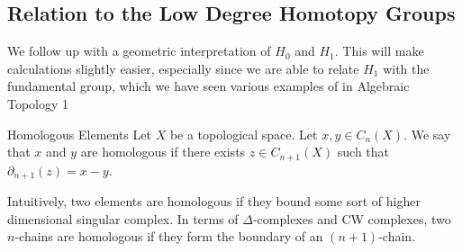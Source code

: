 \documentclass[a4paper]{article}
\begin{document}
\subsection{Relation to the Low Degree Homotopy Groups}
We follow up with a geometric interpretation of $H_0$ and $H_1$. This will make calculations slightly easier, especially since we are able to relate $H_1$ with the fundamental group, which we have seen various examples of in Algebraic Topology 1

\begin{defn}{Homologous Elements}{} Let $X$ be a topological space. Let $x,y\in C_n(X)$. We say that $x$ and $y$ are homologous if there exists $z\in C_{n+1}(X)$ such that $\partial_{n+1}(z)=x-y$. 
\end{defn}

Intuitively, two elements are homologous if they bound some sort of higher dimensional singular complex. In terms of $\Delta$-complexes and CW complexes, two $n$-chains are homologous if they form the boundary of an $(n+1)$-chain. 
\end{document}
